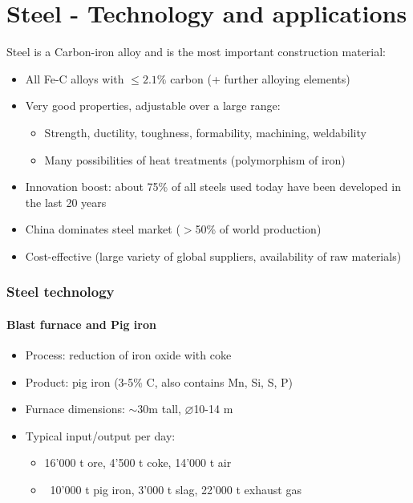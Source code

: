 \documentclass{article}
\begin{document}
\newpage
\part{Steel - Technology and applications}
Steel is a Carbon-iron alloy and is the most important construction material:
\begin{itemize}
  \item All Fe-C alloys with $\leq 2.1\%$ carbon (+ further alloying elements)
  \item Very good properties, adjustable over a large range:
  \begin{itemize}
    \item Strength, ductility, toughness, formability, machining, weldability
    \item Many possibilities of heat treatments (polymorphism of iron)
  \end{itemize}
  \item Innovation boost: about 75\% of all steels used today have been developed in the last 20 years
  \item China dominates steel market ($>$50\% of world production)
  \item Cost-effective (large variety of global suppliers, availability of raw materials)
\end{itemize}

\section{Steel technology}
\subsection{Blast furnace and Pig iron}
\begin{itemize}
  \item Process: reduction of iron oxide with coke 
  \item Product: pig iron (3-5\% C, also contains Mn, Si, S, P)
  \item Furnace dimensions: $\sim$30m tall, $\varnothing$10-14 m
  \item Typical input/output per day:
  \begin{itemize}
    \item 16'000 t ore, 4'500 t coke, 14'000 t air
    \item \textrightarrow\ 10'000 t pig iron, 3'000 t slag, 22'000 t exhaust gas
  \end{itemize}
\end{itemize}
\end{document}
